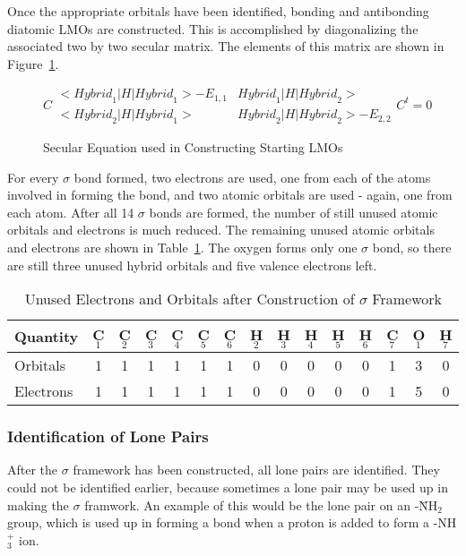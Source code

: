 Once the appropriate orbitals have been identified, bonding and antibonding
diatomic LMOs are constructed.   This is accomplished by diagonalizing the
associated two by two secular matrix.  The elements of this matrix are shown in
Figure~\ref{2by2}.
\begin{figure}
\begin{makeimage}
\end{makeimage}
\caption{\label{2by2}Secular Equation used in Constructing Starting LMOs}
\[
C \begin{array}{cc}
<\mathit{Hybrid}_1|H|\mathit{Hybrid}_1>-E_{1,1} & \mathit{Hybrid}_1|H|\mathit{Hybrid}_2> \\
<\mathit{Hybrid}_2|H|\mathit{Hybrid}_1> & \mathit{Hybrid}_2|H|\mathit{Hybrid}_2> -E_{2,2}
\end{array} C^{t} =0
\]
\end{figure}

For every $\sigma$ bond formed, two electrons are used, one from each of the
atoms involved in forming the bond, and two atomic orbitals are used - again,
one from each atom.  After all 14 $\sigma$ bonds are formed, the number of
still unused atomic orbitals and electrons is much reduced.  The remaining
unused atomic orbitals and electrons are shown in Table~\ref{after-sig}. The
oxygen forms only one $\sigma$ bond, so  there are still three unused hybrid
orbitals and five valence electrons left.

\begin{table}
\caption{\label{after-sig} Unused Electrons and Orbitals after Construction of
$\sigma$ Framework}
\begin{tabular}{lcccccccccccccc}\\ \hline
Quantity & C$_1$ & C$_2$ & C$_3$ & C$_4$ & C$_5$ & C$_6$ & H$_2$ & H$_3$ &
H$_4$ & H$_5$ & H$_6$ & C$_7$ & O$_1$ & H$_7$  \\ \hline
Orbitals  & 1 &  1 & 1 & 1 & 1 & 1 & 0 & 0 &  0 &  0 &  0 &  1 & 3 & 0  \\
Electrons & 1 &  1 & 1 & 1 & 1 & 1 & 0 & 0 &  0 &  0 &  0 &  1 & 5 & 0  \\
\hline
\end{tabular}
\end{table}

\subsubsection{Identification of Lone Pairs}
After the $\sigma$ framework has been constructed, all lone pairs are
identified.  They could not be identified earlier, because sometimes a lone
pair may be used up in making the $\sigma$ framwork.  An example of this would
be the lone pair on an -\"{N}H$_2$ group, which is used up in forming a bond
when a proton is added to form a -NH$_3^+$ ion.

